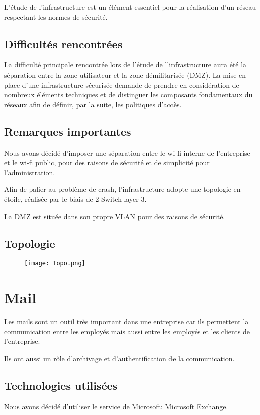 \documentclass{article}
\begin{document}
L'étude de l'infrastructure est un élément essentiel pour la réalisation d'un réseau respectant les normes de sécurité.

\subsection{Difficultés rencontrées}
La difficulté principale rencontrée lors de l'étude de l'infrastructure aura été la séparation entre la zone utilisateur et la zone démilitarisée (DMZ). La mise en place d'une infrastructure sécurisée demande de prendre en considération de nombreux éléments techniques et de distinguer les composants fondamentaux du réseaux afin de définir, par la suite, les politiques d'accès.

\subsection{Remarques importantes}

Nous avons décidé d'imposer une séparation entre le wi-fi interne de l'entreprise et le wi-fi public, pour des raisons de sécurité et de simplicité pour l'administration.

Afin de palier au problème de crash, l'infrastructure adopte une topologie en étoile, réalisée par le biais de 2 Switch layer 3.

La DMZ est située dans son propre VLAN pour des raisons de sécurité.
\newpage
\subsection{Topologie}

\begin{figure}[ht]

\begin{center}
\texttt{[image: Topo.png]} 
\end{center}

\end{figure}

\section{Mail}
Les mails sont un outil très important dans une entreprise car ils permettent la communication entre les employés mais aussi entre les employés et les clients de l'entreprise.

Ils ont aussi un rôle d'archivage et d'authentification de la communication.
\subsection{Technologies utilisées}
Nous avons décidé d'utiliser le service de Microsoft: Microsoft Exchange.
\end{document}
